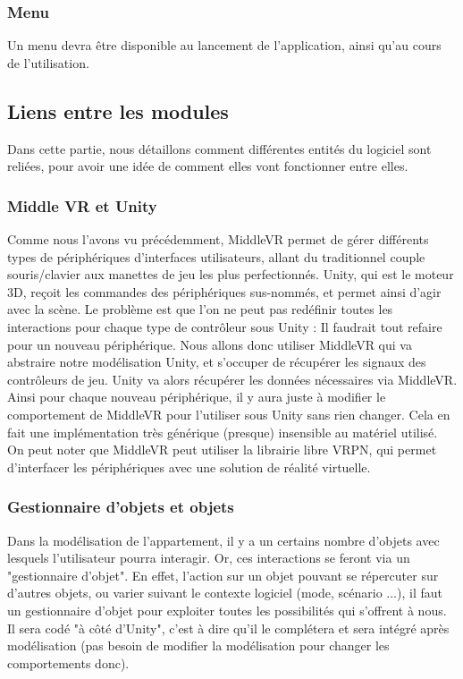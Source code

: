 		\subsubsection{Menu}
			Un menu devra être disponible au lancement de l'application, ainsi qu'au cours de l'utilisation.

%
%
\subsection{Liens entre les modules}
Dans cette partie, nous détaillons comment différentes entités du logiciel sont reliées, pour avoir une idée de comment elles vont fonctionner entre elles.

\subsubsection{Middle VR et Unity}
Comme nous l'avons vu précédemment, MiddleVR permet de gérer différents types de périphériques d'interfaces utilisateurs, allant du traditionnel couple souris/clavier aux manettes de jeu les plus perfectionnés. 
Unity, qui est le moteur 3D, reçoit les commandes des périphériques sus-nommés, et permet ainsi d'agir avec la scène. 
Le problème est que l'on ne peut pas redéfinir toutes les interactions pour chaque type de contrôleur sous Unity : Il faudrait tout refaire pour un nouveau périphérique. 
Nous allons donc utiliser MiddleVR qui va abstraire notre modélisation Unity, et s'occuper de récupérer les signaux des contrôleurs de jeu. Unity va alors récupérer les données nécessaires via MiddleVR. 
Ainsi pour chaque nouveau périphérique, il y aura juste à modifier le comportement de MiddleVR pour l'utiliser sous Unity sans rien changer. 
Cela en fait une implémentation très générique (presque) insensible au matériel utilisé.
On peut noter que MiddleVR peut utiliser la librairie libre VRPN, qui permet d'interfacer les périphériques avec une solution de réalité virtuelle.


\subsubsection{Gestionnaire d'objets et objets}

Dans la modélisation de l'appartement, il y a un certains nombre d'objets avec lesquels l'utilisateur pourra interagir. 
Or, ces interactions se feront via un "gestionnaire d'objet". 
En effet, l'action sur un objet pouvant se répercuter sur d'autres objets, ou varier suivant le contexte logiciel (mode, scénario ...), il faut un gestionnaire d'objet pour exploiter toutes les possibilités qui s'offrent à nous. 
Il sera codé "à côté d'Unity", c'est à dire qu'il le complétera et sera intégré après modélisation (pas besoin de modifier la modélisation pour changer les comportements donc).

